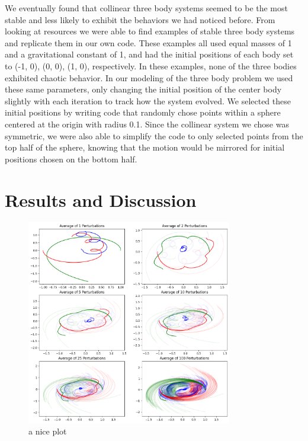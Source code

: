 \documentclass{article}
\begin{document}
We eventually found that collinear three body systems seemed to be the most stable and less likely to exhibit the behaviors we had noticed before. From looking at resources we were able to find examples of stable three body systems and replicate them in our own code. These examples all used equal masses of 1 and a gravitational constant of 1, and had the initial positions of each body set to (-1, 0), (0, 0), (1, 0), respectively. In these examples, none of the three bodies exhibited chaotic behavior.
In our modeling of the three body problem we used these same parameters, only changing the initial position of the center body slightly with each iteration to track how the system evolved. We selected these initial positions by writing code that randomly chose points within a sphere centered at the origin with radius 0.1. Since the collinear system we chose was symmetric, we were also able to simplify the code to only selected points from the top half of the sphere, knowing that the motion would be mirrored for initial positions chosen on the bottom half. 

\section{Results and Discussion}
\begin{figure}[h!]
    \centering
    \includegraphics[width=0.8\textwidth]{Images/averages1to100.png}
    \caption{a nice plot}
    \label{fig:mesh1}
\end{figure}
\end{document}

